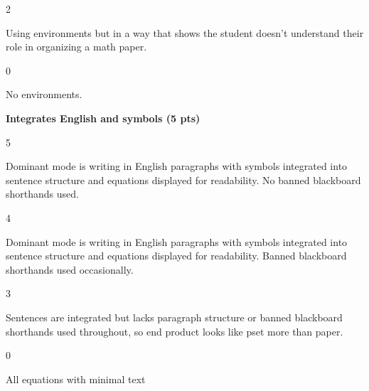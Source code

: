 \documentclass{article}
\begin{document}
    \par\hfill\par
    2
    \par
    Using environments but in a way that shows the student doesn't
    understand their role in organizing a math paper.
    \par\hfill\par
    0
    \par
    No environments.
    \par\hfill\par
    \textbf{Integrates English and symbols (5 pts)}
    \par\hfill\par
    5
    \par
    Dominant mode is writing in English paragraphs with symbols
    integrated into sentence structure and equations displayed
    for readability. No banned blackboard shorthands used.
    \par\hfill\par
    4
    \par
    Dominant mode is writing in English paragraphs with symbols
    integrated into sentence structure and equations displayed for
    readability. Banned blackboard shorthands used occasionally.
    \par\hfill\par
    3
    \par
    Sentences are integrated but lacks paragraph structure or
    banned blackboard shorthands used throughout, so end product
    looks like pset more than paper.
    \par\hfill\par
    0
    \par
    All equations with minimal text
\end{document}
